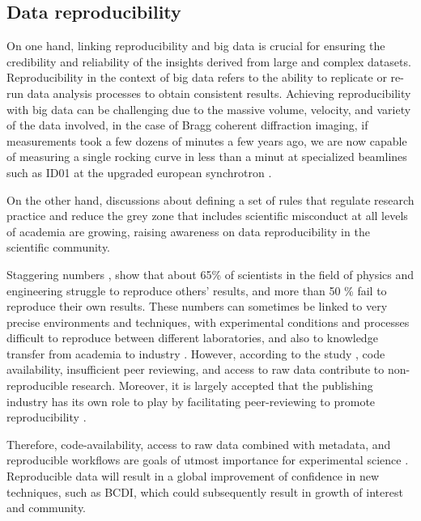
\subsection{Data reproducibility}

On one hand, linking reproducibility and big data is crucial for ensuring the credibility and reliability of the insights derived from large and complex datasets.
Reproducibility in the context of big data refers to the ability to replicate or re-run data analysis processes to obtain consistent results.
Achieving reproducibility with big data can be challenging due to the massive volume, velocity, and variety of the data involved, in the case of Bragg coherent diffraction imaging, if measurements took a few dozens of minutes a few years ago, we are now capable of measuring a single rocking curve in less than a minut at specialized beamlines such as ID01 at the upgraded european synchrotron \parencite{Richter2019}.

On the other hand, discussions about defining a set of rules that regulate research practice \parencite{Kretser2019} and reduce the grey zone that includes scientific misconduct at all levels of academia \parencite{Kornfeld2016} are growing, raising awareness on data reproducibility in the scientific community.

Staggering numbers \parencite{Baker2016}, show that about 65\% of scientists in the field of physics and engineering struggle to reproduce others' results, and more than 50 \% fail to reproduce their own results.
These numbers can sometimes be linked to very precise environments and techniques, with experimental conditions and processes difficult to reproduce between different laboratories, and also to knowledge transfer from academia to industry \parencite{DanielSarwitz2015}.
However, according to the study  \parencite{Baker2016}, code availability, insufficient peer reviewing, and access to raw data contribute to non-reproducible research.
Moreover, it is largely accepted that the publishing industry has its own role to play by facilitating peer-reviewing to promote reproducibility \parencite{Lee2017}.

Therefore, code-availability, access to raw data combined with metadata, and reproducible workflows are goals of utmost importance for experimental science \parencite{Munafo2017}.
Reproducible data will result in a global improvement of confidence in new techniques, such as BCDI, which could subsequently result in growth of interest and community.

